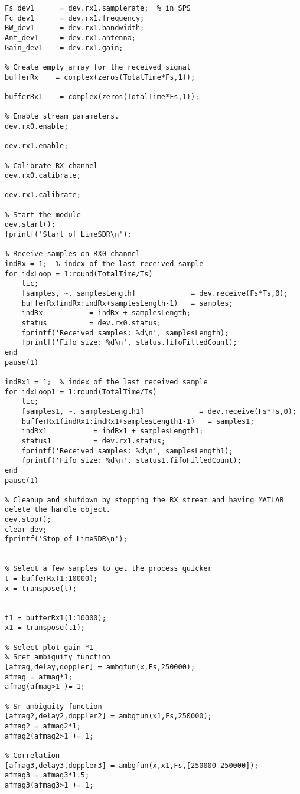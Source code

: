 \begin{verbatim}
Fs_dev1      = dev.rx1.samplerate;  % in SPS
Fc_dev1      = dev.rx1.frequency;
BW_dev1      = dev.rx1.bandwidth;
Ant_dev1     = dev.rx1.antenna;
Gain_dev1    = dev.rx1.gain;

% Create empty array for the received signal
bufferRx    = complex(zeros(TotalTime*Fs,1));

bufferRx1    = complex(zeros(TotalTime*Fs,1));

% Enable stream parameters. 
dev.rx0.enable;

dev.rx1.enable;

% Calibrate RX channel
dev.rx0.calibrate;

dev.rx1.calibrate;

% Start the module
dev.start();
fprintf('Start of LimeSDR\n');

% Receive samples on RX0 channel
indRx = 1;  % index of the last received sample
for idxLoop = 1:round(TotalTime/Ts)
    tic;
    [samples, ~, samplesLength]             = dev.receive(Fs*Ts,0);
    bufferRx(indRx:indRx+samplesLength-1)   = samples;
    indRx           = indRx + samplesLength;
    status          = dev.rx0.status;
    fprintf('Received samples: %d\n', samplesLength);
    fprintf('Fifo size: %d\n', status.fifoFilledCount);
end
pause(1)

indRx1 = 1;  % index of the last received sample
for idxLoop1 = 1:round(TotalTime/Ts)
    tic;
    [samples1, ~, samplesLength1]             = dev.receive(Fs*Ts,0);
    bufferRx1(indRx1:indRx1+samplesLength1-1)   = samples1;
    indRx1           = indRx1 + samplesLength1;
    status1          = dev.rx1.status;
    fprintf('Received samples: %d\n', samplesLength1);
    fprintf('Fifo size: %d\n', status1.fifoFilledCount);
end
pause(1)

% Cleanup and shutdown by stopping the RX stream and having MATLAB delete the handle object.
dev.stop();
clear dev;
fprintf('Stop of LimeSDR\n');


% Select a few samples to get the process quicker
t = bufferRx(1:10000);
x = transpose(t);


t1 = bufferRx1(1:10000);
x1 = transpose(t1);

% Select plot gain *1
% Sref ambiguity function
[afmag,delay,doppler] = ambgfun(x,Fs,250000);
afmag = afmag*1;
afmag(afmag>1 )= 1;

% Sr ambiguity function
[afmag2,delay2,doppler2] = ambgfun(x1,Fs,250000);
afmag2 = afmag2*1;
afmag2(afmag2>1 )= 1;

% Correlation
[afmag3,delay3,doppler3] = ambgfun(x,x1,Fs,[250000 250000]);
afmag3 = afmag3*1.5;
afmag3(afmag3>1 )= 1;



\end{verbatim}
